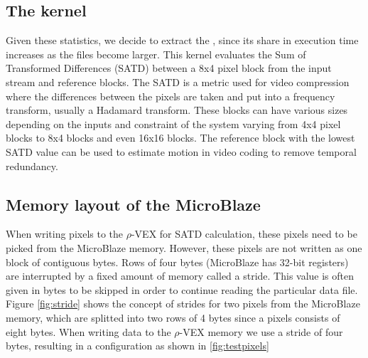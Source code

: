 \subsection{The  kernel}
\label{sec:kernel}
Given these statistics, we decide to extract the , since its share in execution time increases as the files become larger. This kernel evaluates the Sum of Transformed Differences (SATD) between a 8x4 pixel block from the input stream and reference blocks. The SATD is a metric used for video compression where the differences between the pixels are taken and put into a frequency transform, usually a Hadamard transform. These blocks can have various sizes depending on the inputs and constraint of the system varying from 4x4 pixel blocks to 8x4 blocks and even 16x16 blocks. The reference block with the lowest SATD value can be used to estimate motion in video coding to remove temporal redundancy. 

\subsection{Memory layout of the MicroBlaze}
\label{sec:layout}

When writing pixels to the $\rho$-VEX for SATD calculation, these pixels need to be picked from the MicroBlaze memory. However, these pixels are not written as one block of contiguous bytes. Rows of four bytes (MicroBlaze has 32-bit registers) are interrupted by a fixed amount of memory called a stride. This value is often given in bytes to be skipped in order to continue reading the particular data file. Figure \ref{fig:stride} shows the concept of strides for two pixels from the MicroBlaze memory, which are splitted into two rows of 4 bytes since a pixels consists of eight bytes. When writing data to the $\rho$-VEX memory we use a stride of four bytes, resulting in a configuration as shown in \ref{fig:testpixels}

